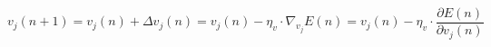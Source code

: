 \begin{equation}\label{eq:exemplo-1}
    v_j(n+1) = v_j(n) + \Delta v_j(n) =  v_j(n) - \eta_v\cdot\nabla_{v_j}E(n) = v_j(n) - \eta_v\cdot\frac{\partial E(n)}{\partial v_j(n)}
\end{equation}



